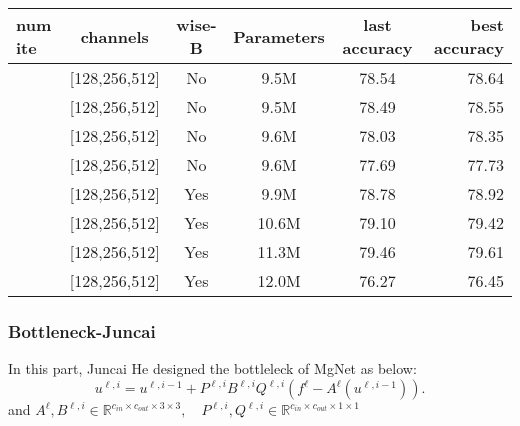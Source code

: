 \begin{table}[H]
	\begin{tabular}{| l | c | c | c | c | r |}
		\hline
		num ite       &      channels        &  wise-B     &    Parameters   &   last accuracy   &  best accuracy  \\
		\hline
		[2,2,2]        &   [128,256,512]      &  No         &    9.5M         &    78.54          &  78.64          \\
		\hline
		[4,4,4]        &   [128,256,512]      &  No         &    9.5M         &    78.49          &  78.55          \\
		\hline
		[6,6,6]        &   [128,256,512]      &  No         &    9.6M         &    78.03          &  78.35          \\
		\hline
		[8,8,8]        &   [128,256,512]      &  No         &    9.6M         &    77.69          &  77.73          \\
		\hline
		\hline
		[2,2,2]        &   [128,256,512]      &  Yes        &    9.9M         &    78.78          &  78.92          \\
		\hline
		[4,4,4]        &   [128,256,512]      &  Yes        &    10.6M        &    79.10          &  79.42          \\
		\hline
		[6,6,6]        &   [128,256,512]      &  Yes        &    11.3M        &    79.46          &  79.61          \\
		\hline
		[8,8,8]        &   [128,256,512]      &  Yes        &    12.0M        &    76.27          &  76.45          \\
		\hline
	\end{tabular}
\end{table}

\subsubsection{Bottleneck-Juncai}
In this part, Juncai He designed the bottleleck of MgNet as below:
\begin{equation}
u^{\ell,i} = u^{\ell,i-1} + P^{\ell,i}B^{\ell,i}Q^{\ell,i}(f^\ell -  A^{\ell} (u^{\ell,i-1})).
\end{equation}
and $A^{\ell},B^{\ell,i}\in \mathbb{R}^{c_{in}\times c_{out}\times 3\times 3},\quad P^{\ell,i},Q^{\ell,i} \in \mathbb{R}^{c_{in}\times c_{out}\times 1\times 1}$

